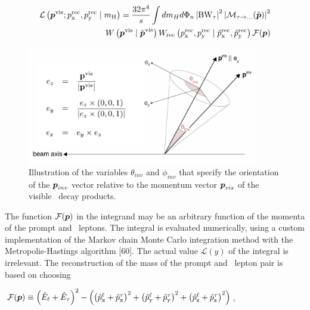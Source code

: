 \begin{linenomath*}
  \begin{equation*}
    \begin{aligned}
        \mathcal{L}\left(\boldsymbol{p}^{\mathrm{vis}} ; p_{\mathrm{x}}^{\mathrm{rec}}, p_{\mathrm{y}}^{\mathrm{rec}} \mid m_{\mathrm{H}}\right)=\frac{32 \pi^{4}}{s} \int dm_{H} d \Phi_{n} \left|\mathrm{BW}_{\tau}\right|^{2} \left|\mathcal{M}_{\tau \rightarrow \ldots}(\tilde{\boldsymbol{p}})\right|^{2} \\
        W\left(\boldsymbol{p}^{\mathrm{vis}} \mid \hat{\boldsymbol{p}}^{\mathrm{vis}}\right) W_{\mathrm{rec}}\left(p_{\mathrm{x}}^{\mathrm{rec}}, p_{\mathrm{y}}^{\mathrm{rec}} \mid \hat{p}_{\mathrm{x}}^{\mathrm{rec}}, \hat{p}_{\mathrm{y}}^{\mathrm{rec}} \right) \mathcal{F}(\boldsymbol{p})
    \end{aligned}
  \end{equation*}
\end{linenomath*}

\begin{figure}[!htpb]
  \centering
  \includegraphics[width=0.9\textwidth]{plots/appendix/SV.png}
  \caption{Illustration of the variables $\theta_{inv}$ and $\phi_{inv}$ that specify the orientation of the $\boldsymbol{p}_{inv}$ vector relative to the momentum vector $\boldsymbol{p}_{vis}$ of the visible \Pgt\, decay products.}
  \label{fig:sv}
\end{figure}

The function $\mathcal{F}(\boldsymbol{p})$ in the integrand may be an arbitrary function of the momenta \bp of the prompt and \Pgt\, leptons. The integral is evaluated numerically, using a custom implementation of the Markov chain Monte Carlo integration method with the Metropolis-Hastings algorithm [60]. The actual value $\mathcal{L}(y)$ of the integral is irrelevant. The reconstruction of the mass \mlt of the prompt and \Pgt\, lepton pair is based on choosing

$\mathcal{F}(\boldsymbol{p}) \equiv \left(\hat{E}_{\ell} + \hat{E}_{\tau}\right)^{2} - \left(\left(\hat{p}_{\mathrm{x}}^{\ell}+\hat{p}_{\mathrm{x}}^{\tau}\right)^{2}+\left(\hat{p}_{\mathrm{y}}^{\ell}+\hat{p}_{\mathrm{y}}^{\tau}\right)^{2}+\left(\hat{p}_{\mathrm{z}}^{\ell}+\hat{p}_{\mathrm{z}}^{\tau}\right)^{2}\right)$,

